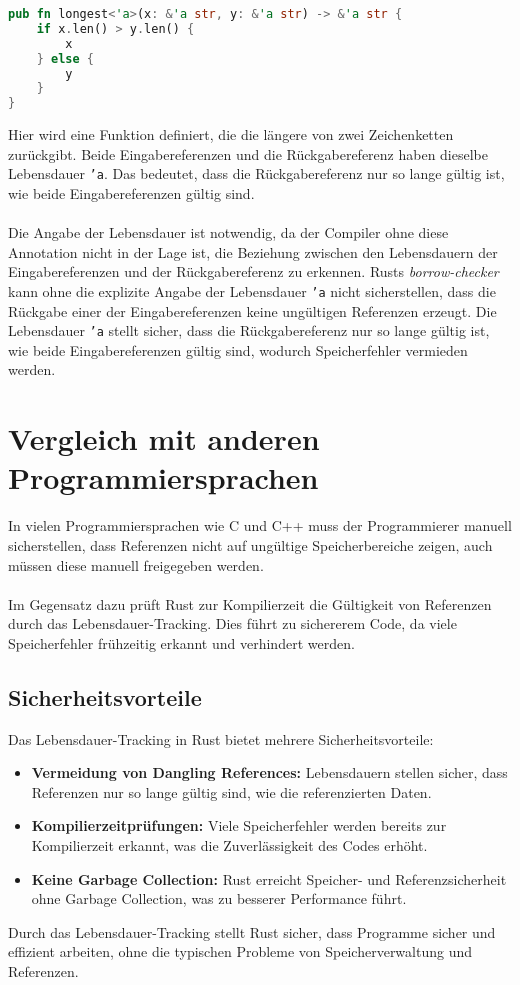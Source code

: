 \begin{lstlisting}[language=Rust, caption={Expliziete lifetime}]
pub fn longest<'a>(x: &'a str, y: &'a str) -> &'a str {
    if x.len() > y.len() {
        x
    } else {
        y
    }
}
\end{lstlisting}
\noindent
Hier wird eine Funktion definiert, die die längere von zwei Zeichenketten zurückgibt. 
Beide Eingabereferenzen und die Rückgabereferenz haben dieselbe Lebensdauer \texttt{'a}. 
Das bedeutet, dass die Rückgabereferenz nur so lange gültig ist, wie beide Eingabereferenzen gültig sind.\\
\\
Die Angabe der Lebensdauer ist notwendig, da der Compiler ohne diese Annotation nicht in der Lage ist, die Beziehung zwischen den Lebensdauern der Eingabereferenzen und der Rückgabereferenz zu erkennen. 
Rusts \textit{\gls{borrow-checker}} kann ohne die explizite Angabe der Lebensdauer \texttt{'a} nicht sicherstellen, dass die Rückgabe einer der Eingabereferenzen keine ungültigen Referenzen erzeugt. 
Die Lebensdauer \texttt{'a} stellt sicher, dass die Rückgabereferenz nur so lange gültig ist, wie beide Eingabereferenzen gültig sind, wodurch Speicherfehler vermieden werden.

\section{Vergleich mit anderen Programmiersprachen}
In vielen Programmiersprachen wie C und C++ muss der Programmierer manuell sicherstellen, dass Referenzen nicht auf ungültige Speicherbereiche zeigen, auch müssen diese manuell freigegeben werden. \\
\\
Im Gegensatz dazu prüft Rust zur Kompilierzeit die Gültigkeit von Referenzen durch das Lebensdauer-Tracking. 
Dies führt zu sichererem Code, da viele Speicherfehler frühzeitig erkannt und verhindert werden.

\subsection{Sicherheitsvorteile}
Das Lebensdauer-Tracking in Rust bietet mehrere Sicherheitsvorteile:

\begin{itemize}
    \item \textbf{Vermeidung von Dangling References:} Lebensdauern stellen sicher, dass Referenzen nur so lange gültig sind, wie die referenzierten Daten.
    \item \textbf{Kompilierzeitprüfungen:} Viele Speicherfehler werden bereits zur Kompilierzeit erkannt, was die Zuverlässigkeit des Codes erhöht.
    \item \textbf{Keine Garbage Collection:} Rust erreicht Speicher- und Referenzsicherheit ohne Garbage Collection, was zu besserer Performance führt.
\end{itemize}
\noindent
Durch das Lebensdauer-Tracking stellt Rust sicher, dass Programme sicher und effizient arbeiten, ohne die typischen Probleme von Speicherverwaltung und Referenzen.

